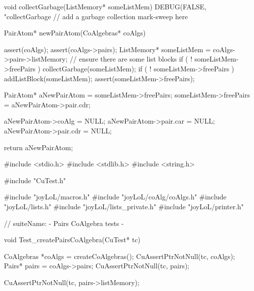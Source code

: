 void collectGarbage(ListMemory* someListMem) {
  DEBUG(FALSE, "collectGarbage %
  // add a garbage collection mark-sweep here
}

PairAtom* newPairAtom(CoAlgebras* coAlgs) {
  assert(coAlgs);
  assert(coAlgs->pairs);
  ListMemory* someListMem = coAlgs->pairs->listMemory;
  // ensure there are some list blocks
  if ( ! someListMem->freePairs ) collectGarbage(someListMem);
  if ( ! someListMem->freePairs ) addListBlock(someListMem);
  assert(someListMem->freePairs);

  PairAtom* aNewPairAtom = someListMem->freePairs;
  someListMem->freePairs = aNewPairAtom->pair.cdr;

  aNewPairAtom->coAlg    = NULL;
  aNewPairAtom->pair.car = NULL;
  aNewPairAtom->pair.cdr = NULL;

  return aNewPairAtom;
}
\stopCCode


\starttyping
#include <stdio.h>
#include <stdlib.h>
#include <string.h>

#include "CuTest.h"

#include "joyLoL/macros.h"
#include "joyLoL/coAlg/coAlgs.h"
#include "joyLoL/lists.h"
#include "joyLoL/lists_private.h"
#include "joyLoL/printer.h"

// suiteName: - Pairs CoAlgebra tests -

void Test_createPairsCoAlgebra(CuTest* tc) {
  CoAlgebras *coAlgs = createCoAlgebras();
  CuAssertPtrNotNull(tc, coAlgs);
  Pairs* pairs = coAlgs->pairs;
  CuAssertPtrNotNull(tc, pairs);

  CuAssertPtrNotNull(tc, pairs->listMemory);
}


